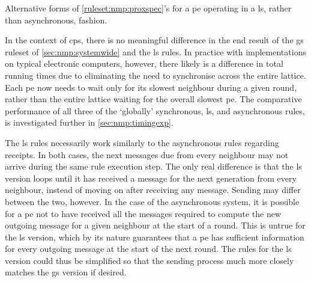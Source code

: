 \begin{cprulesetfloat}
    \begin{cpruleset}
    
        
        
    \end{cpruleset}
    \caption[Alternative forms of \cref{ruleset:nmp:proxspec}'s rule 10]{\label{ruleset:nmp:localsync}Alternative forms of \cref{ruleset:nmp:proxspec}'s  for a \gls{pe} operating in a \gls{ls}, rather than asynchronous, fashion.}
\end{cprulesetfloat}

In the context of \gls{cps}, there is no meaningful difference in the end result of the \gls{gs} \gls{ruleset} of \cref{sec:nmp:systemwide} and the \gls{ls} rules.  In practice with implementations on typical electronic computers, however, there likely is a difference in total running times due to eliminating the need to synchronise across the entire lattice.  Each \gls{pe} now needs to wait only for its slowest neighbour during a given round, rather than the entire lattice waiting for the overall slowest \gls{pe}.  The comparative performance of all three of the `globally' synchronous, \gls{ls}, and asynchronous rules, is investigated further in \cref{sec:nmp:timingexp}.

The \gls{ls} rules necessarily work similarly to the asynchronous rules regarding receipts.  In both cases, the next messages due from every neighbour may not arrive during the same rule execution step.  The only real difference is that the \gls{ls} version loops until it has received a message for the next generation from every neighbour, instead of moving on after receiving any message.  Sending may differ between the two, however.  In the case of the asynchronous system, it is possible for a \gls{pe} not to have received all the messages required to compute the new outgoing message for a given neighbour at the start of a round.  This is untrue for the \gls{ls} version, which by its nature guarantees that a \gls{pe} has sufficient information for every outgoing message at the start of the next round.  The rules for the \gls{ls} version could thus be simplified so that the sending process much more closely matches the \gls{gs} version if desired.

